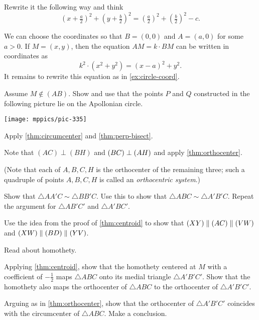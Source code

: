  Rewrite it the following way and think 
\[(x+\tfrac a2)^2+(y+\tfrac b2)^2=(\tfrac a2)^2+(\tfrac b2)^2-c.\]


We can choose the coordinates so that $B=(0,0)$ and $A=(a,0)$ for some $a>0$.
If $M=(x,y)$, then the equation $AM=k\cdot BM$ can be written in coordinates as 
\[k^2\cdot(x^2+y^2)=(x-a)^2+y^2.\]
It remains to rewrite this equation as in \ref{ex:circle-coord}.

Assume $M\notin(AB)$.
Show and use that the points $P$ and $Q$ constructed in the following picture lie on the Apollonian circle.

\begin{Figure}
\centering
\texttt{[image: mppics/pic-335]}
\end{Figure}


\setcounter{eqtn}{0}

Apply \ref{thm:circumcenter} and \ref{thm:perp-bisect}.

Note that $(AC)\perp (BH)$ and $(BC)\perp (AH)$ and apply \ref{thm:orthocenter}.

(Note that each of $A,B,C,H$ is the orthocenter of the remaining three; such a quadruple of points $A,B,C,H$ is called an \emph{orthocentric system}.)

Show that $\triangle AA'C \sim \triangle BB'C$.
Use this to show that $\triangle ABC \sim \triangle A'B'C$.
Repeat the argument for $\triangle AB'C'$ and $\triangle A'BC'$.

Use the idea from the proof of \ref{thm:centroid}
to show that $(XY)\parallel (AC)\parallel (VW)$ and
$(XW)\parallel (BD)\parallel (YV)$.

Read about homothety.

Applying \ref{thm:centroid}, show that the homothety centered at $M$ with a coefficient of $-\tfrac{1}{2}$ maps $\triangle ABC$ onto its medial triangle $\triangle A'B'C'$.
Show that the homothety also maps the orthocenter of $\triangle ABC$ to the orthocenter of $\triangle A'B'C'$.

Arguing as in \ref{thm:orthocenter}, show that the orthocenter of $\triangle A'B'C'$ coincides with the circumcenter of $\triangle ABC$.
Make a conclusion.

